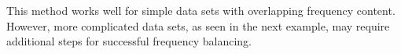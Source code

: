 
    
    This method works well for simple data sets with overlapping frequency content. 
    However, more complicated data sets, as seen in the next example, may require additional steps for successful frequency balancing.
    
